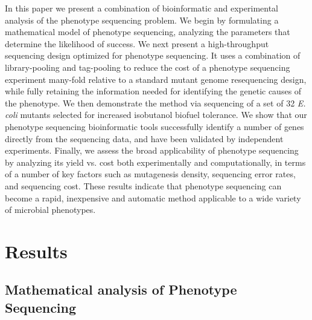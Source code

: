 \documentclass[letterpaper,10pt,english]{howto}
\begin{document}
In this paper we present a combination of bioinformatic and
experimental analysis of the phenotype sequencing problem.  We begin
by formulating a mathematical model of phenotype sequencing,
analyzing the parameters that determine the likelihood
of success.  We next present a high-throughput sequencing design
optimized for phenotype sequencing.  It uses a combination of
library-pooling and tag-pooling to reduce the cost of a
phenotype sequencing experiment many-fold relative to a standard
mutant genome resequencing design, while fully retaining the
information needed for identifying the genetic causes of the phenotype.
We then demonstrate the method via
sequencing of a set of 32 \emph{E. coli} mutants
selected for increased isobutanol biofuel tolerance.  We show
that our phenotype sequencing bioinformatic tools successfully
identify a number of genes directly from the sequencing data,
and have been validated by independent experiments.
Finally, we assess the broad applicability of phenotype sequencing
by analyzing its yield vs. cost both experimentally and
computationally, in terms of a number of key
factors such as mutagenesis density, sequencing error rates,
and sequencing cost.  These results indicate that phenotype sequencing
can become a rapid, inexpensive and automatic method applicable
to a wide variety of microbial phenotypes.


\section{Results}


\subsection{Mathematical analysis of Phenotype Sequencing}
\end{document}
